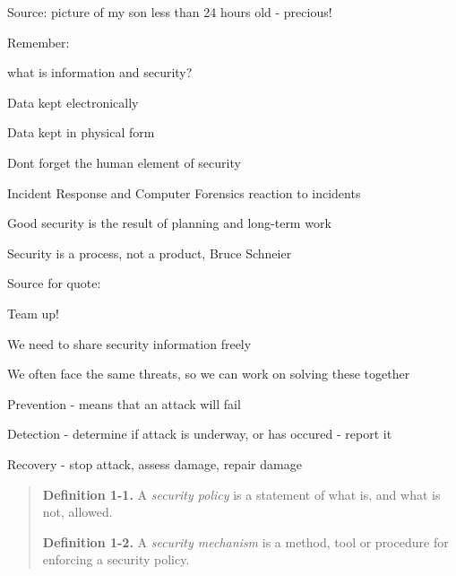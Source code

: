 \documentclass[Screen16to9,17pt]{foils}
\begin{document}
Source: picture of my son less than 24 hours old - precious!


\begin{list1}
\item Remember:
\begin{list2}
\item what is information and security?
\item Data kept electronically
\item Data kept in physical form
\item Dont forget the human element of security
\end{list2}
\item Incident Response and Computer Forensics reaction to incidents
\item Good security is the result of planning and long-term work
\end{list1}
\vskip 1cm
\centerline{\color{titlecolor}\LARGE Security is a process, not a product, Bruce Schneier}

Source for quote: 




\begin{list1}
\item Team up!
\item We need to share security information freely
\item We often face the same threats, so we can work on solving these together
\end{list1}


\begin{list1}
\item Prevention - means that an attack will fail
\item Detection - determine if attack is underway, or has occured - report it
\item Recovery - stop attack, assess damage, repair damage
\end{list1}


\begin{quote}
{\bf Definition 1-1.} A \emph{security policy} is a statement of what is, and what is not, allowed.

{\bf Definition 1-2.} A \emph{security mechanism} is a method, tool or procedure for enforcing a security policy.
\end{quote}
\end{document}
